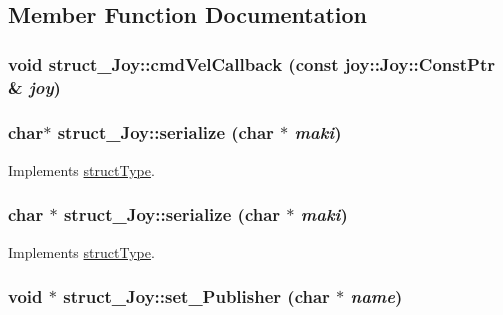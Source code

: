 \subsection{Member Function Documentation}
\hypertarget{classstruct__Joy_a0663befcb572431d8dc37cccc56bd6e5}{
\subsubsection[{cmdVelCallback}]{\setlength{\rightskip}{0pt plus 5cm}void struct\_\-Joy::cmdVelCallback (const joy::Joy::ConstPtr \& {\em joy})}}
\label{classstruct__Joy_a0663befcb572431d8dc37cccc56bd6e5}
\hypertarget{classstruct__Joy_a0241cea32ad81ade99f9b484107e218d}{
\subsubsection[{serialize}]{\setlength{\rightskip}{0pt plus 5cm}char$\ast$ struct\_\-Joy::serialize (char $\ast$ {\em maki})}}
\label{classstruct__Joy_a0241cea32ad81ade99f9b484107e218d}


Implements \hyperlink{classstructType_a515f5e08e2c7c054145d5dcce4e8adb1}{structType}.

\hypertarget{classstruct__Joy_a85a218f4a0da41e33f9bf001c12c3a5a}{
\subsubsection[{serialize}]{\setlength{\rightskip}{0pt plus 5cm}char $\ast$ struct\_\-Joy::serialize (char $\ast$ {\em maki})}}
\label{classstruct__Joy_a85a218f4a0da41e33f9bf001c12c3a5a}


Implements \hyperlink{classstructType_a515f5e08e2c7c054145d5dcce4e8adb1}{structType}.

\hypertarget{classstruct__Joy_a775c0f43b9125d8523ed26e72b6ebc44}{
\subsubsection[{set\_\-Publisher}]{\setlength{\rightskip}{0pt plus 5cm}void $\ast$ struct\_\-Joy::set\_\-Publisher (char $\ast$ {\em name})}}
\label{classstruct__Joy_a775c0f43b9125d8523ed26e72b6ebc44}


